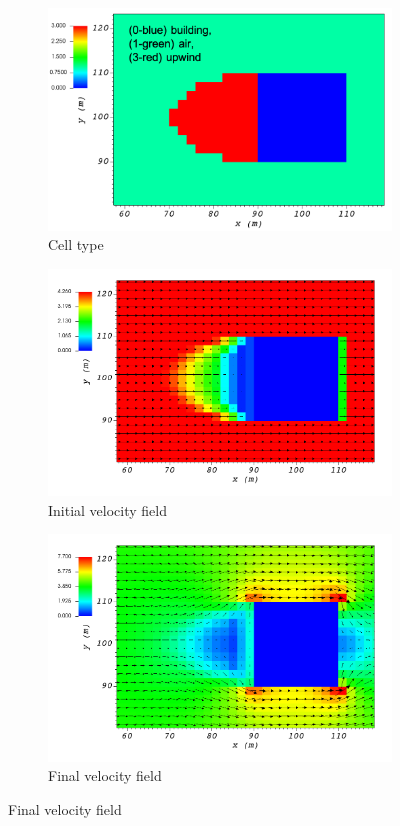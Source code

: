 \documentclass[14pt,landscape]{report}
\begin{document}
\begin{figure}[p]
    \centering
    \begin{subfigure}[t]{0.45\textwidth}
    \centering
    \includegraphics[width=10.3cm,keepaspectratio]{Images/upwind_z_5_3_init_icell.png}
    \caption{Cell type}
    \end{subfigure}
    \begin{subfigure}[t]{0.45\textwidth}
    \centering
    \includegraphics[width=11.0cm,keepaspectratio]{Images/upwind_z_5_3_init_vel.png}
    \caption{Initial velocity field}
    \end{subfigure}
    \begin{subfigure}[t]{0.45\textwidth}
    \centering
    \includegraphics[width=11.0cm,keepaspectratio]{Images/upwind_z_5_3_final.png}
    \caption{Final velocity field}
    \end{subfigure}
\end{figure}
\end{document}
